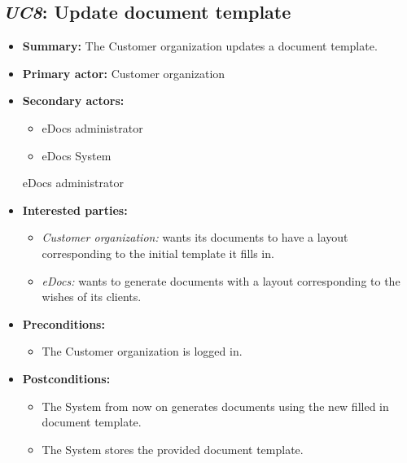 \documentclass[a4paper,10pt]{article}
\begin{document}
\subsection{\emph{UC8}: Update document template}
\begin{itemize}
	\item \textbf{Summary:} The Customer organization updates a document template.
    \item \textbf{Primary actor:} Customer organization
    \item \textbf{Secondary actors:} 
    	\begin{itemize}
        	\item eDocs administrator
        	\item eDocs System
        \end{itemize}eDocs administrator
    \item \textbf{Interested parties:} 
        \begin{itemize}
            \item \textit{Customer organization:} wants its documents to have a layout corresponding to the initial template it fills in.
            \item \textit{eDocs:} wants to generate documents with a layout corresponding to the wishes of its clients.
        \end{itemize}

    \item \textbf{Preconditions:}
        \begin{itemize}
            \item The Customer organization is logged in.
        \end{itemize}

    \item \textbf{Postconditions:}
        \begin{itemize}
            \item The System from now on generates documents using the new filled in document template.
            \item The System stores the provided document template.
        \end{itemize}
        

\end{itemize}
\end{document}
